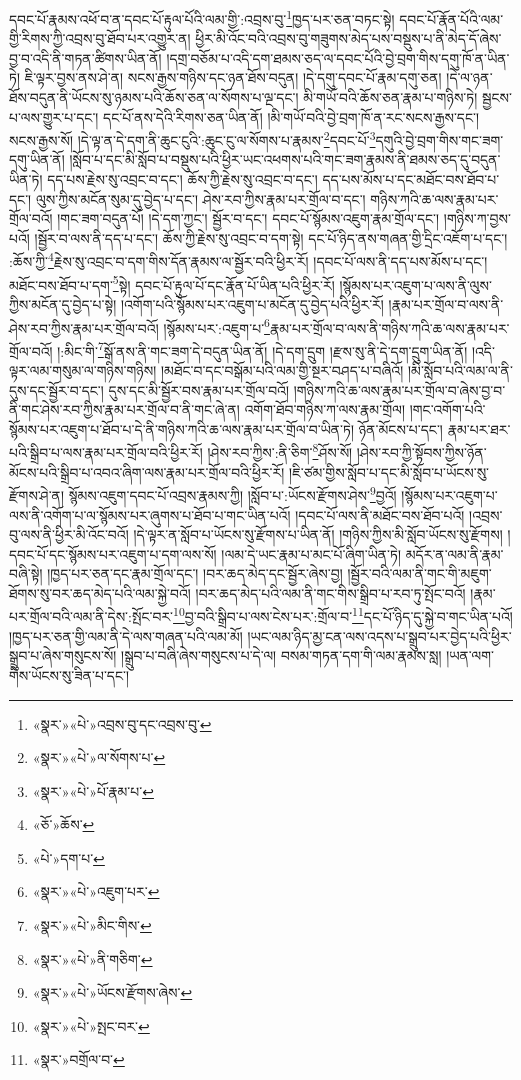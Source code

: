 དབང་པོ་རྣམས་འཕོ་བ་ན་དབང་པོ་རྟུལ་པོའི་ལམ་གྱི་:འབྲས་བུ་\footnote{«སྣར་»«པེ་»འབྲས་བུ་དང་འབྲས་བུ་}ཁྱད་པར་ཅན་བཏང་སྟེ། དབང་པོ་རྣོན་པོའི་ལམ་གྱི་རིགས་ཀྱི་འབྲས་བུ་ཐོབ་པར་འགྱུར་ན། ཕྱིར་མི་འོང་བའི་འབྲས་བུ་གཟུགས་མེད་པས་བསྡུས་པ་ནི་མེད་དོ་ཞེས་བྱ་བ་འདི་ནི་གཏན་ཚིགས་ཡིན་ནོ། །དགྲ་བཅོམ་པ་འདི་དག་ཐམས་ཅད་ལ་དབང་པོའི་བྱེ་བྲག་གིས་དགུ་ཁོ་ན་ཡིན་ཏེ། ཇི་ལྟར་བྱས་ནས་ཤེ་ན། སངས་རྒྱས་གཉིས་དང་ཉན་ཐོས་བདུན། །དེ་དགུ་དབང་པོ་རྣམ་དགུ་ཅན། །དེ་ལ་ཉན་ཐོས་བདུན་ནི་ཡོངས་སུ་ཉམས་པའི་ཆོས་ཅན་ལ་སོགས་པ་ལྔ་དང་། མི་གཡོ་བའི་ཆོས་ཅན་རྣམ་པ་གཉིས་ཏེ། སྦྱངས་པ་ལས་གྱུར་པ་དང་། དང་པོ་ནས་དེའི་རིགས་ཅན་ཡིན་ནོ། །མི་གཡོ་བའི་བྱེ་བྲག་ཁོ་ན་རང་སངས་རྒྱས་དང་། སངས་རྒྱས་སོ། །དེ་ལྟ་ན་དེ་དག་ནི་ཆུང་ངུའི་:ཆུང་ངུ་ལ་སོགས་པ་རྣམས་\footnote{«སྣར་»«པེ་»ལ་སོགས་པ་}དབང་པོ་\footnote{«སྣར་»«པེ་»པོ་རྣམ་པ་}དགུའི་བྱེ་བྲག་གིས་གང་ཟག་དགུ་ཡིན་ནོ། །སློབ་པ་དང་མི་སློབ་པ་བསྡུས་པའི་ཕྱིར་ཡང་འཕགས་པའི་གང་ཟག་རྣམས་ནི་ཐམས་ཅད་དུ་བདུན་ཡིན་ཏེ། དད་པས་རྗེས་སུ་འབྲང་བ་དང་། ཆོས་ཀྱི་རྗེས་སུ་འབྲང་བ་དང་། དད་པས་མོས་པ་དང་མཐོང་བས་ཐོབ་པ་དང་། ལུས་ཀྱིས་མངོན་སུམ་དུ་བྱེད་པ་དང་། ཤེས་རབ་ཀྱིས་རྣམ་པར་གྲོལ་བ་དང་། གཉིས་ཀའི་ཆ་ལས་རྣམ་པར་གྲོལ་བའོ། །གང་ཟག་བདུན་པོ། །དེ་དག་ཀྱང་། སྦྱོར་བ་དང་། དབང་པོ་སྙོམས་འཇུག་རྣམ་གྲོལ་དང་། །གཉིས་ཀ་བྱས་པའོ། །སྦྱོར་བ་ལས་ནི་དད་པ་དང་། ཆོས་ཀྱི་རྗེས་སུ་འབྲང་བ་དག་སྟེ། དང་པོ་ཉིད་ནས་གཞན་གྱི་དྲིང་འཇོག་པ་དང་། :ཆོས་ཀྱི་\footnote{«ཅོ་»ཆོས་}རྗེས་སུ་འབྲང་བ་དག་གིས་དོན་རྣམས་ལ་སྦྱོར་བའི་ཕྱིར་རོ། །དབང་པོ་ལས་ནི་དད་པས་མོས་པ་དང་། མཐོང་བས་ཐོབ་པ་དག་\footnote{«པེ་»དག་པ་}སྟེ། དབང་པོ་རྟུལ་པོ་དང་རྣོན་པོ་ཡིན་པའི་ཕྱིར་རོ། །སྙོམས་པར་འཇུག་པ་ལས་ནི་ལུས་ཀྱིས་མངོན་དུ་བྱེད་པ་སྟེ། །འགོག་པའི་སྙོམས་པར་འཇུག་པ་མངོན་དུ་བྱེད་པའི་ཕྱིར་རོ། །རྣམ་པར་གྲོལ་བ་ལས་ནི་ཤེས་རབ་ཀྱིས་རྣམ་པར་གྲོལ་བའོ། །སྙོམས་པར་:འཇུག་པ་\footnote{«སྣར་»«པེ་»འཇུག་པར་}རྣམ་པར་གྲོལ་བ་ལས་ནི་གཉིས་ཀའི་ཆ་ལས་རྣམ་པར་གྲོལ་བའོ། །:མིང་གི་\footnote{«སྣར་»«པེ་»མིང་གིས་}སྒོ་ནས་ནི་གང་ཟག་དེ་བདུན་ཡིན་ནོ། །དེ་དག་དྲུག །རྫས་སུ་ནི་དེ་དག་དྲུག་ཡིན་ནོ། །འདི་ལྟར་ལམ་གསུམ་ལ་གཉིས་གཉིས། །མཐོང་བ་དང་བསྒོམ་པའི་ལམ་གྱི་སྔར་བཤད་པ་བཞིའོ། །མི་སློབ་པའི་ལམ་ལ་ནི་དུས་དང་སྦྱོར་བ་དང་། དུས་དང་མི་སྦྱོར་བས་རྣམ་པར་གྲོལ་བའོ། །གཉིས་ཀའི་ཆ་ལས་རྣམ་པར་གྲོལ་བ་ཞེས་བྱ་བ་ནི་གང་ཤེས་རབ་ཀྱིས་རྣམ་པར་གྲོལ་བ་ནི་གང་ཞེ་ན། འགོག་ཐོབ་གཉིས་ཀ་ལས་རྣམ་གྲོལ། །གང་འགོག་པའི་སྙོམས་པར་འཇུག་པ་ཐོབ་པ་དེ་ནི་གཉིས་ཀའི་ཆ་ལས་རྣམ་པར་གྲོལ་བ་ཡིན་ཏེ། ཉོན་མོངས་པ་དང་། རྣམ་པར་ཐར་པའི་སྒྲིབ་པ་ལས་རྣམ་པར་གྲོལ་བའི་ཕྱིར་རོ། །ཤེས་རབ་ཀྱིས་:ནི་ཅིག་\footnote{«སྣར་»«པེ་»ནི་གཅིག་}ཤོས་སོ། །ཤེས་རབ་ཀྱི་སྟོབས་ཀྱིས་ཉོན་མོངས་པའི་སྒྲིབ་པ་འབའ་ཞིག་ལས་རྣམ་པར་གྲོལ་བའི་ཕྱིར་རོ། །ཇི་ཙམ་གྱིས་སློབ་པ་དང་མི་སློབ་པ་ཡོངས་སུ་རྫོགས་ཤེ་ན། སྙོམས་འཇུག་དབང་པོ་འབྲས་རྣམས་ཀྱི། །སློབ་པ་:ཡོངས་རྫོགས་ཤེས་\footnote{«སྣར་»«པེ་»ཡོངས་རྫོགས་ཞེས་}བྱའོ། །སྙོམས་པར་འཇུག་པ་ལས་ནི་འགོག་པ་ལ་སྙོམས་པར་ཞུགས་པ་ཐོབ་པ་གང་ཡིན་པའོ། །དབང་པོ་ལས་ནི་མཐོང་བས་ཐོབ་པའོ། །འབྲས་བུ་ལས་ནི་ཕྱིར་མི་འོང་བའོ། །དེ་ལྟར་ན་སློབ་པ་ཡོངས་སུ་རྫོགས་པ་ཡིན་ནོ། །གཉིས་ཀྱིས་མི་སློབ་ཡོངས་སུ་རྫོགས། །དབང་པོ་དང་སྙོམས་པར་འཇུག་པ་དག་ལས་སོ། །ལམ་དེ་ཡང་རྣམ་པ་མང་པོ་ཞིག་ཡིན་ཏེ། མདོར་ན་ལམ་ནི་རྣམ་བཞི་སྟེ། །ཁྱད་པར་ཅན་དང་རྣམ་གྲོལ་དང་། །བར་ཆད་མེད་དང་སྦྱོར་ཞེས་བྱ། །སྦྱོར་བའི་ལམ་ནི་གང་གི་མཇུག་ཐོགས་སུ་བར་ཆད་མེད་པའི་ལམ་སྐྱེ་བའོ། །བར་ཆད་མེད་པའི་ལམ་ནི་གང་གིས་སྒྲིབ་པ་རབ་ཏུ་སྤོང་བའོ། །རྣམ་པར་གྲོལ་བའི་ལམ་ནི་དེས་:སྤོང་བར་\footnote{«སྣར་»«པེ་»སྤང་བར་}བྱ་བའི་སྒྲིབ་པ་ལས་ངེས་པར་:གྲོལ་བ་\footnote{«སྣར་»བགྲོལ་བ་}དང་པོ་ཉིད་དུ་སྐྱེ་བ་གང་ཡིན་པའོ། །ཁྱད་པར་ཅན་གྱི་ལམ་ནི་དེ་ལས་གཞན་པའི་ལམ་མོ། །ཡང་ལམ་ཉིད་མྱ་ངན་ལས་འདས་པ་སྒྲུབ་པར་བྱེད་པའི་ཕྱིར་སྒྲུབ་པ་ཞེས་གསུངས་སོ། །སྒྲུབ་པ་བཞི་ཞེས་གསུངས་པ་དེ་ལ། བསམ་གཏན་དག་གི་ལམ་རྣམས་སླ། །ཡན་ལག་གིས་ཡོངས་སུ་ཟིན་པ་དང་། 